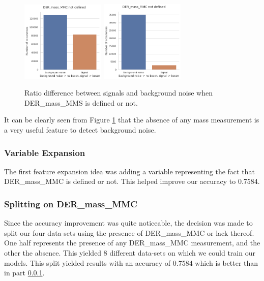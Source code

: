 \documentclass[10pt,conference,compsocconf]{IEEEtran}
\begin{document}
\begin{figure}[h]
    \includegraphics[width=4cm]{DER_mass_MMC_defined.png}
    \includegraphics[width=4cm]{DER_mass_MMC_not_defined.png}
    \caption{Ratio difference between signals and background noise when DER\_mass\_MMS is defined or not.}
    \centering
    \label{mass_occurence}
\end{figure}

It can be clearly seen from Figure \ref{mass_occurence} that the absence of any mass measurement is a very useful feature to detect background noise.


\subsubsection{Variable Expansion}\label{variable expansion}

The first feature expansion idea was adding a variable representing the fact that DER\_mass\_MMC  is defined or not.
This helped improve our accuracy to 0.7584.


\subsubsection{Splitting on DER\_mass\_MMC} \label{split mass}

Since the accuracy improvement was quite noticeable, the decision was made to split our four data-sets using the presence of DER\_mass\_MMC or lack thereof.
One half represents the presence of any DER\_mass\_MMC measurement, and the other the absence.
This yielded 8 different data-sets on which we could train our models.
This split yielded results with an accuracy of 0.7584 which is better than in part \ref{variable expansion}.
\end{document}
